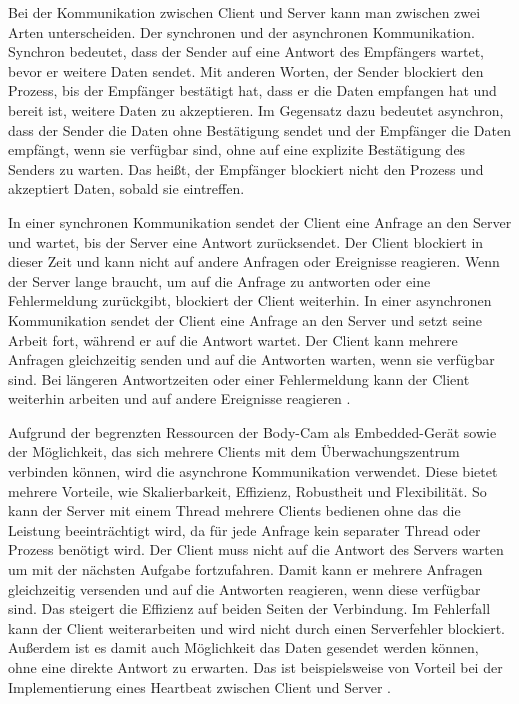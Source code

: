 \documentclass[thesis.tex]{subfiles}
\begin{document}
Bei der Kommunikation zwischen Client und Server kann man zwischen zwei Arten unterscheiden.
Der synchronen und der asynchronen Kommunikation.
Synchron bedeutet, dass der Sender auf eine Antwort des Empfängers wartet, bevor er weitere Daten sendet.
Mit anderen Worten, der Sender blockiert den Prozess, bis der Empfänger bestätigt hat, dass er die Daten empfangen hat und bereit ist, weitere Daten zu akzeptieren.
Im Gegensatz dazu bedeutet asynchron, dass der Sender die Daten ohne Bestätigung sendet und der Empfänger die Daten empfängt, wenn sie verfügbar sind, ohne auf eine explizite Bestätigung des Senders zu warten.
Das heißt, der Empfänger blockiert nicht den Prozess und akzeptiert Daten, sobald sie eintreffen.

In einer synchronen Kommunikation sendet der Client eine Anfrage an den Server und wartet, bis der Server eine Antwort zurücksendet.
Der Client blockiert in dieser Zeit und kann nicht auf andere Anfragen oder Ereignisse reagieren.
Wenn der Server lange braucht, um auf die Anfrage zu antworten oder eine Fehlermeldung zurückgibt, blockiert der Client weiterhin.
In einer asynchronen Kommunikation sendet der Client eine Anfrage an den Server und setzt seine Arbeit fort, während er auf die Antwort wartet.
Der Client kann mehrere Anfragen gleichzeitig senden und auf die Antworten warten, wenn sie verfügbar sind.
Bei längeren Antwortzeiten oder einer Fehlermeldung kann der Client weiterhin arbeiten und auf andere Ereignisse reagieren
\cite[vgl. S.1-3]{lim2019directly}.

Aufgrund der begrenzten Ressourcen der Body-Cam als Embedded-Gerät sowie der Möglichkeit, das sich mehrere Clients mit dem Überwachungszentrum verbinden können, wird die asynchrone Kommunikation verwendet.
Diese bietet mehrere Vorteile, wie Skalierbarkeit, Effizienz, Robustheit und Flexibilität.
So kann der Server mit einem Thread mehrere Clients bedienen ohne das die Leistung beeinträchtigt wird, da für jede Anfrage kein separater Thread oder Prozess benötigt wird.
Der Client muss nicht auf die Antwort des Servers warten um mit der nächsten Aufgabe fortzufahren.
Damit kann er mehrere Anfragen gleichzeitig versenden und auf die Antworten reagieren, wenn diese verfügbar sind.
Das steigert die Effizienz auf beiden Seiten der Verbindung.
Im Fehlerfall kann der Client weiterarbeiten und wird nicht durch einen Serverfehler blockiert.
Außerdem ist es damit auch Möglichkeit das Daten gesendet werden können, ohne eine direkte Antwort zu erwarten.
Das ist beispielsweise von Vorteil bei der Implementierung eines Heartbeat zwischen Client und Server
\cite[vgl.]{whyAsync,thinkAsync}.
\end{document}
